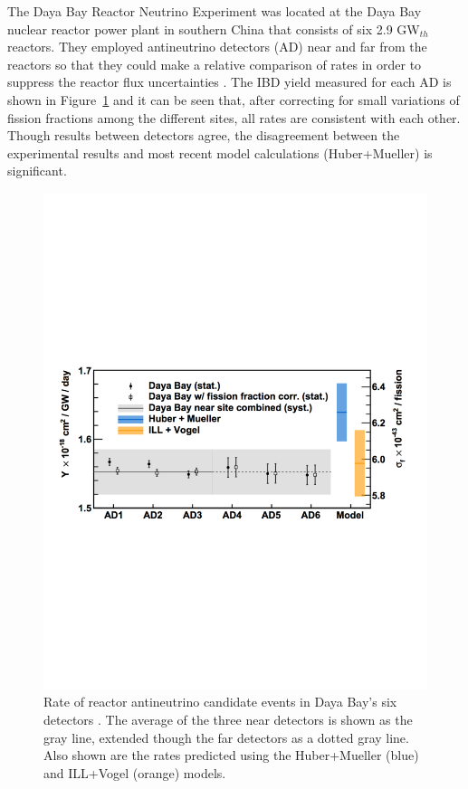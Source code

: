 The Daya Bay Reactor Neutrino Experiment was located at the Daya Bay nuclear reactor power plant in southern China that consists of six 2.9 GW$_{th}$ reactors. 
They employed antineutrino detectors (AD) near and far from the reactors so that they could make a relative comparison of rates in order to suppress the reactor flux uncertainties \cite{An:2015qga,DayaBayAnomaly}.
The IBD yield measured for each AD is shown in Figure~\ref{fig:dayabayflux} and it can be seen that, after correcting for small variations of fission fractions among the different sites, all rates are consistent with each other. Though results between detectors agree, the disagreement between the experimental results and most recent model calculations (Huber+Mueller) is significant. 

\begin{figure}[!t]
	\centering
	\includegraphics[width=0.7\linewidth]{tex/3-reactorneutrinos-images/DayaBayFlux}
	\caption{Rate of reactor antineutrino candidate events in Daya Bay's six detectors \cite{DayaBayAnomaly}. The average of the three near detectors is shown as the gray line, extended though the far detectors as a dotted gray line. Also shown are the rates predicted using the Huber+Mueller (blue) and ILL+Vogel (orange) models.}
	\label{fig:dayabayflux}
\end{figure}

